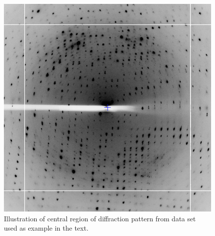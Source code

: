 \documentclass[a4paper, 11pt]{article}
\begin{document}
\begin{figure}
\caption{Illustration of central region of diffraction pattern from
  data set used as example in the text. \label{figure-diffraction}}
\begin{center}
\includegraphics[scale=0.35]{figures/3qrn-diffraction.png}
\end{center}
\end{figure}
\end{document}
